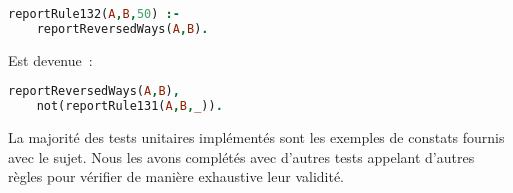 \begin{lstlisting}[language=Prolog,frame=single]
reportRule132(A,B,50) :-
    reportReversedWays(A,B).
\end{lstlisting}

Est devenue~:

\begin{lstlisting}[language=Prolog,frame=single]
reportReversedWays(A,B),
    not(reportRule131(A,B,_)).
\end{lstlisting}

La majorité des tests unitaires implémentés sont les exemples de constats fournis avec le sujet. Nous les avons complétés avec d'autres tests appelant d'autres règles pour vérifier de manière exhaustive leur validité.


